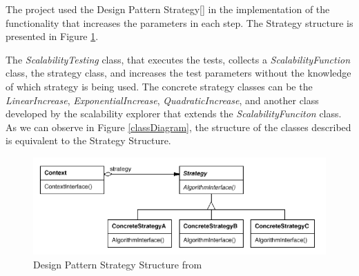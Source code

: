 The project used the Design Pattern Strategy[\citet{GOF1995}] in the implementation of the functionality that increases the parameters in each step. The Strategy structure is presented in Figure \ref{strategyStructure}. 

The \emph{ScalabilityTesting} class, that executes the tests, collects a \emph{ScalabilityFunction} class, the strategy class, and increases the test parameters without the knowledge of which strategy is being used. The concrete strategy classes can be the \emph{LinearIncrease}, \emph{ExponentialIncrease}, \emph{QuadraticIncrease}, and another class developed by the scalability explorer that extends the \emph{ScalabilityFunciton} class. As we can observe in Figure \ref{classDiagram}, the structure of the classes described is equivalent to the Strategy Structure.
\begin{figure}[htbp]
\begin{center}
	\includegraphics[scale=0.5]{images/strategyStructure}
\caption{Design Pattern Strategy Structure from \citet{GOF1995}}
\label{strategyStructure}
\end{center}
\end{figure}


